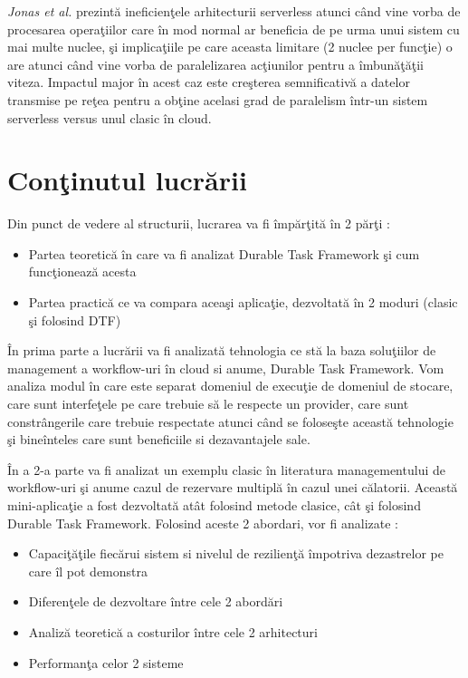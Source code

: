 \par\emph{Jonas et al.} \cite{jonas2017} prezintă ineficienţele arhitecturii serverless atunci când vine vorba de procesarea operaţiilor care în mod normal ar beneficia de pe urma unui sistem cu mai multe nuclee, şi implicaţiile pe care aceasta limitare (2 nuclee per funcţie) o are atunci când vine vorba de paralelizarea acţiunilor pentru a îmbunăţăţii viteza. Impactul major în acest caz este creşterea semnificativă a datelor transmise pe reţea pentru a obţine acelasi grad de paralelism într-un sistem serverless versus unul clasic în cloud. 


\section{Conţinutul lucrării}
 Din punct de vedere al structurii, lucrarea va fi împărţită în 2 părţi :
\begin{itemize}
\item Partea teoretică în care va fi analizat Durable Task Framework şi cum funcţionează acesta
\item Partea practică ce va compara aceaşi aplicaţie, dezvoltată în 2 moduri (clasic şi folosind DTF)
\end{itemize}
\par În prima parte a lucrării va fi analizată tehnologia ce stă la baza soluţiilor de management a workflow-uri în cloud si anume, Durable Task Framework. Vom analiza modul în care este separat domeniul de execuţie de domeniul de stocare, care sunt interfeţele pe care trebuie să le respecte un provider, care sunt constrângerile care trebuie respectate atunci când se foloseşte această tehnologie şi bineînteles care sunt beneficiile si dezavantajele sale. 
\par În a 2-a parte va fi analizat un exemplu clasic în literatura managementului de workflow-uri şi anume cazul de rezervare multiplă în cazul unei călatorii. Această mini-aplicaţie a fost dezvoltată atât folosind metode clasice, cât şi folosind Durable Task Framework. Folosind aceste 2 abordari, vor fi analizate : 
\begin{itemize}
\item Capaciţăţile fiecărui sistem si nivelul de rezilienţă împotriva dezastrelor pe care îl pot demonstra
\item Diferenţele de dezvoltare între cele 2 abordări
\item Analiză teoretică a costurilor între cele 2 arhitecturi 
\item Performanţa celor 2 sisteme
\end{itemize}
